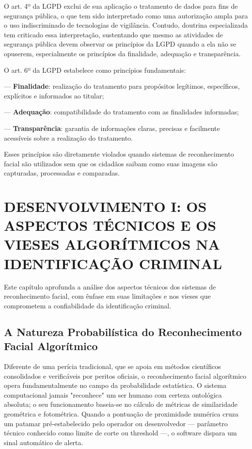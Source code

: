 \documentclass[12pt,a4paper]{article}
\begin{document}
O art. 4º da LGPD exclui de sua aplicação o tratamento de dados para fins de segurança pública, o que tem sido interpretado como uma autorização ampla para o uso indiscriminado de tecnologias de vigilância. Contudo, doutrina especializada tem criticado essa interpretação, sustentando que mesmo as atividades de segurança pública devem observar os princípios da LGPD quando a ela não se opuserem, especialmente os princípios da finalidade, adequação e transparência.

O art. 6º da LGPD estabelece como princípios fundamentais:

--- \textbf{Finalidade}: realização do tratamento para propósitos legítimos, específicos, explícitos e informados ao titular;

--- \textbf{Adequação}: compatibilidade do tratamento com as finalidades informadas;

--- \textbf{Transparência}: garantia de informações claras, precisas e facilmente acessíveis sobre a realização do tratamento.

Esses princípios são diretamente violados quando sistemas de reconhecimento facial são utilizados sem que os cidadãos saibam como suas imagens são capturadas, processadas e comparadas.

\section{DESENVOLVIMENTO I: OS ASPECTOS TÉCNICOS E OS VIESES ALGORÍTMICOS NA IDENTIFICAÇÃO CRIMINAL}

Este capítulo aprofunda a análise dos aspectos técnicos dos sistemas de reconhecimento facial, com ênfase em suas limitações e nos vieses que comprometem a confiabilidade da identificação criminal.

\subsection{A Natureza Probabilística do Reconhecimento Facial Algorítmico}

Diferente de uma perícia tradicional, que se apoia em métodos científicos consolidados e verificáveis por peritos oficiais, o reconhecimento facial algorítmico opera fundamentalmente no campo da probabilidade estatística. O sistema computacional jamais "reconhece" um ser humano com certeza ontológica absoluta; o seu funcionamento baseia-se no cálculo de métricas de similaridade geométrica e fotométrica. Quando a pontuação de proximidade numérica cruza um patamar pré-estabelecido pelo operador ou desenvolvedor --- parâmetro técnico conhecido como limite de corte ou threshold ---, o software dispara um sinal automático de alerta.
\end{document}
